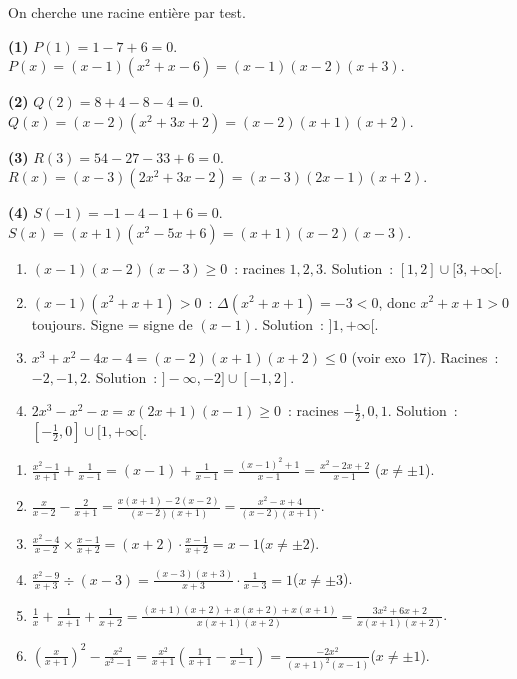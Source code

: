 
On cherche une racine enti\`ere par test.

\textbf{(1)} $P(1)=1-7+6=0$. $P(x)=(x-1)(x^2+x-6)=(x-1)(x-2)(x+3)$.

\textbf{(2)} $Q(2)=8+4-8-4=0$. $Q(x)=(x-2)(x^2+3x+2)=(x-2)(x+1)(x+2)$.

\textbf{(3)} $R(3)=54-27-33+6=0$. $R(x)=(x-3)(2x^2+3x-2)=(x-3)(2x-1)(x+2)$.

\textbf{(4)} $S(-1)=-1-4-1+6=0$. $S(x)=(x+1)(x^2-5x+6)=(x+1)(x-2)(x-3)$.


\begin{enumerate}
  \item $(x-1)(x-2)(x-3)\geq0$~: racines $1,2,3$.
        Solution~: $[1,2]\cup[3,+\infty[$.
  \item $(x-1)(x^2+x+1)>0$~: $\Delta(x^2+x+1)=-3<0$, donc $x^2+x+1>0$ toujours.
        Signe = signe de $(x-1)$. Solution~: $]1,+\infty[$.
  \item $x^3+x^2-4x-4=(x-2)(x+1)(x+2)\leq0$ (voir exo~17).
        Racines~: $-2,-1,2$. Solution~: $]-\infty,-2]\cup[-1,2]$.
  \item $2x^3-x^2-x=x(2x+1)(x-1)\geq0$~: racines $-\frac{1}{2},0,1$.
        Solution~: $[-\frac{1}{2},0]\cup[1,+\infty[$.
\end{enumerate}


\begin{enumerate}
  \item $\frac{x^2-1}{x+1}+\frac{1}{x-1}=(x-1)+\frac{1}{x-1}
        =\frac{(x-1)^2+1}{x-1}=\frac{x^2-2x+2}{x-1}$ \quad($x\ne\pm1$).
  \item $\frac{x}{x-2}-\frac{2}{x+1}
        =\frac{x(x+1)-2(x-2)}{(x-2)(x+1)}=\frac{x^2-x+4}{(x-2)(x+1)}$.
  \item $\frac{x^2-4}{x-2}\times\frac{x-1}{x+2}=(x+2)\cdot\frac{x-1}{x+2}=x-1$\quad($x\ne\pm2$).
  \item $\frac{x^2-9}{x+3}\div(x-3)=\frac{(x-3)(x+3)}{x+3}\cdot\frac{1}{x-3}=1$\quad($x\ne\pm3$).
  \item $\frac{1}{x}+\frac{1}{x+1}+\frac{1}{x+2}
        =\frac{(x+1)(x+2)+x(x+2)+x(x+1)}{x(x+1)(x+2)}=\frac{3x^2+6x+2}{x(x+1)(x+2)}$.
  \item $\left(\frac{x}{x+1}\right)^2-\frac{x^2}{x^2-1}
        =\frac{x^2}{x+1}\!\left(\frac{1}{x+1}-\frac{1}{x-1}\right)
        =\frac{-2x^2}{(x+1)^2(x-1)}$\quad($x\ne\pm1$).
\end{enumerate}

